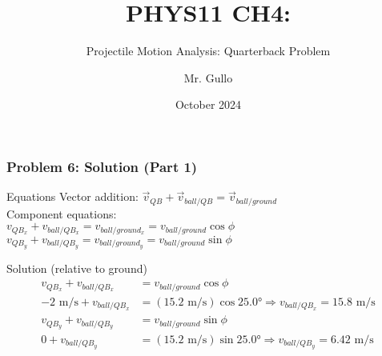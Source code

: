 \documentclass{beamer}
\begin{document}
\begin{frame}
\frametitle{Problem 6: Solution (Part 1)}
\begin{block}{Equations}
Vector addition: $\vec{v}_{QB} + \vec{v}_{ball/QB} = \vec{v}_{ball/ground}$\\
Component equations:\\ 
$v_{QB_x} + v_{ball/QB_x} = v_{ball/ground_x} = v_{ball/ground} \cos \phi$\\
$v_{QB_y} + v_{ball/QB_y} = v_{ball/ground_y} = v_{ball/ground} \sin \phi$
\end{block}
\begin{block}{Solution}
(relative to ground)
\begin{align*}
v_{QB_x} + v_{ball/QB_x} &= v_{ball/ground} \cos \phi \\
-2 \text{ m/s} + v_{ball/QB_x} &= (15.2 \text{ m/s}) \cos 25.0° \Rightarrow v_{ball/QB_x} = 15.8 \text{ m/s}\\
v_{QB_y} + v_{ball/QB_y} &= v_{ball/ground} \sin \phi \\
0 + v_{ball/QB_y} &= (15.2 \text{ m/s}) \sin 25.0° \Rightarrow v_{ball/QB_y} = 6.42 \text{ m/s}
\end{align*}
\end{block}
\end{frame}

\title[Projectile Motion Analysis]{PHYS11 CH4:}
\subtitle{Projectile Motion Analysis: Quarterback Problem}
\author[Mr. Gullo]{Mr. Gullo}
\date[Oct 2024]{October 2024}

\end{document}
